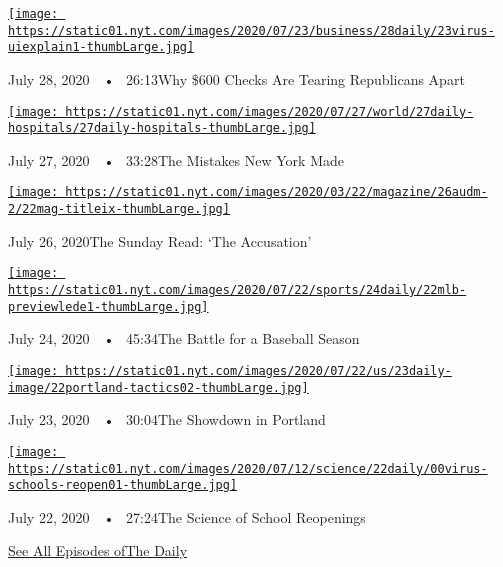 \href{https://www.nytimes.com/2020/07/28/podcasts/the-daily/unemployment-benefits-coronavirus.html?action=click\&module=audio-series-bar\&region=header\&pgtype=Article}{\texttt{[image: https://static01.nyt.com/images/2020/07/23/business/28daily/23virus-uiexplain1-thumbLarge.jpg]}}

July 28, 2020~~•~ 26:13Why \$600 Checks Are Tearing Republicans Apart

\href{https://www.nytimes.com/2020/07/27/podcasts/the-daily/new-york-hospitals-covid.html?action=click\&module=audio-series-bar\&region=header\&pgtype=Article}{\texttt{[image: https://static01.nyt.com/images/2020/07/27/world/27daily-hospitals/27daily-hospitals-thumbLarge.jpg]}}

July 27, 2020~~•~ 33:28The Mistakes New York Made

\href{https://www.nytimes.com/2020/07/26/podcasts/the-daily/the-accusation-the-sunday-read.html?action=click\&module=audio-series-bar\&region=header\&pgtype=Article}{\texttt{[image: https://static01.nyt.com/images/2020/03/22/magazine/26audm-2/22mag-titleix-thumbLarge.jpg]}}

July 26, 2020The Sunday Read: `The Accusation'

\href{https://www.nytimes.com/2020/07/24/podcasts/the-daily/mlb-baseball-season-coronavirus.html?action=click\&module=audio-series-bar\&region=header\&pgtype=Article}{\texttt{[image: https://static01.nyt.com/images/2020/07/22/sports/24daily/22mlb-previewlede1-thumbLarge.jpg]}}

July 24, 2020~~•~ 45:34The Battle for a Baseball Season

\href{https://www.nytimes.com/2020/07/23/podcasts/the-daily/portland-protests.html?action=click\&module=audio-series-bar\&region=header\&pgtype=Article}{\texttt{[image: https://static01.nyt.com/images/2020/07/22/us/23daily-image/22portland-tactics02-thumbLarge.jpg]}}

July 23, 2020~~•~ 30:04The Showdown in Portland

\href{https://www.nytimes.com/2020/07/22/podcasts/the-daily/school-reopenings-coronavirus.html?action=click\&module=audio-series-bar\&region=header\&pgtype=Article}{\texttt{[image: https://static01.nyt.com/images/2020/07/12/science/22daily/00virus-schools-reopen01-thumbLarge.jpg]}}

July 22, 2020~~•~ 27:24The Science of School Reopenings

\href{https://www.nytimes.com/column/the-daily}{See All Episodes ofThe
Daily}

